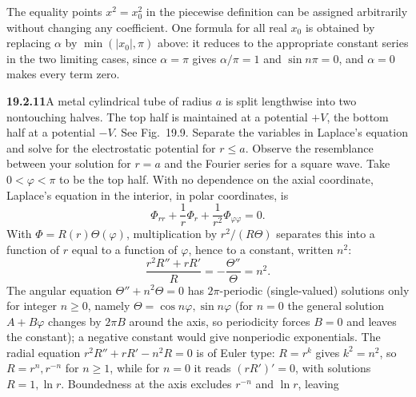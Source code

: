 The equality points $x^2=x_0^2$ in the piecewise definition can be
assigned arbitrarily without changing any coefficient. One formula for
all real $x_0$ is obtained by replacing $\alpha$ by $\min(|x_0|,\pi)$
above: it reduces to the appropriate constant series in the two limiting
cases, since $\alpha=\pi$ gives $\alpha/\pi=1$ and $\sin n\pi=0$, and
$\alpha=0$ makes every term zero.

\par\bigskip
\noindent\textbf{19.2.11}\quad A metal cylindrical tube of radius
$a$ is split lengthwise into two nontouching halves. The top half
is maintained at a potential $+V$, the bottom half at a potential
$-V$. See Fig.~19.9. Separate the variables in Laplace's equation
and solve for the electrostatic potential for $r\le a$. Observe
the resemblance between your solution for $r=a$ and the Fourier
series for a square wave.
\solution
{}
Take $0<\varphi<\pi$ to be the top half. With no dependence on the axial
coordinate, Laplace's equation in the interior, in polar coordinates, is
\[
\Phi_{rr}+\frac1r\Phi_r+\frac1{r^2}\Phi_{\varphi\varphi}=0.
\]
With $\Phi=R(r)\Theta(\varphi)$, multiplication by $r^2/(R\Theta)$
separates this into a function of $r$ equal to a function of $\varphi$,
hence to a constant, written $n^2$:
\[
\frac{r^2R''+rR'}R=-\frac{\Theta''}\Theta=n^2.
\]
The angular equation $\Theta''+n^2\Theta=0$ has $2\pi$-periodic
(single-valued) solutions only for integer $n\ge0$, namely
$\Theta=\cos n\varphi,\sin n\varphi$ (for $n=0$ the general solution
$A+B\varphi$ changes by $2\pi B$ around the axis, so periodicity forces
$B=0$ and leaves the constant); a negative constant would give
nonperiodic exponentials. The radial equation $r^2R''+rR'-n^2R=0$ is
of Euler type: $R=r^k$ gives $k^2=n^2$, so $R=r^n,r^{-n}$ for $n\ge1$,
while for $n=0$ it reads $(rR')'=0$, with solutions $R=1,\ln r$.
Boundedness at the axis excludes $r^{-n}$ and $\ln r$, leaving
